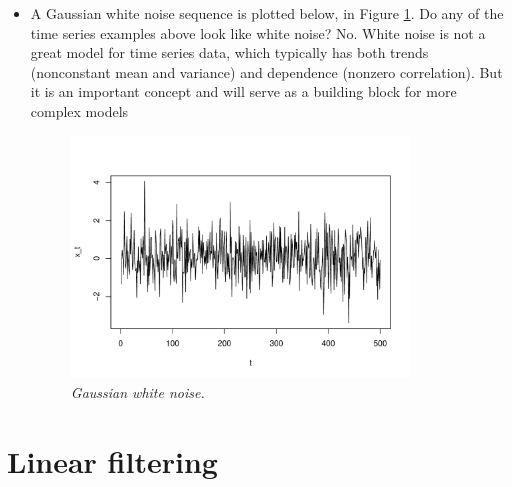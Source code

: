 \documentclass{article}
\begin{document}
\begin{itemize}
\item A Gaussian white noise sequence is plotted below, in Figure
  \ref{fig:wn}. Do any of the time series examples above look like white noise?
  No. White noise is not a great model for time series data, which typically has
  both trends (nonconstant mean and variance) and dependence (nonzero
  correlation). But it is an important concept and will serve as a building
  block for more complex models  

\begin{figure}[t]
\centering
\includegraphics[width=0.85\textwidth]{fig/wn-1.pdf}
\caption{\it Gaussian white noise.}
\label{fig:wn}
\end{figure}
\end{itemize}

\section{Linear filtering}
\end{document}
